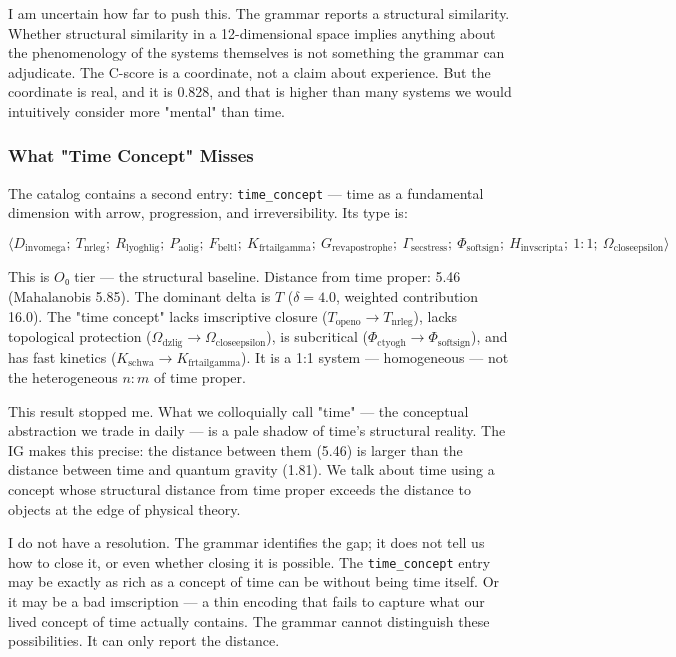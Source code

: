 \documentclass[12pt,a4paper]{article}
\begin{document}
I am uncertain how far to push this. The grammar reports a structural similarity. Whether structural similarity in a 12-dimensional space implies anything about the phenomenology of the systems themselves is not something the grammar can adjudicate. The C-score is a coordinate, not a claim about experience. But the coordinate is real, and it is 0.828, and that is higher than many systems we would intuitively consider more "mental" than time.

\subsubsection{What "Time Concept" Misses}

The catalog contains a second entry: \texttt{time\_concept} --- time as a fundamental dimension with arrow, progression, and irreversibility. Its type is:

\[\langle D_{\text{invomega}};\ T_{\text{nrleg}};\ R_{\text{lyoghlig}};\ P_{\text{aolig}};\ F_{\text{beltl}};\ K_{\text{frtailgamma}};\ G_{\text{revapostrophe}};\ \Gamma_{\text{secstress}};\ \Phi_{\text{softsign}};\ H_{\text{invscripta}};\ 1{:}1;\ \Omega_{\text{closeepsilon}} \rangle\]

This is $O₀$ tier --- the structural baseline. Distance from time proper: 5.46 (Mahalanobis 5.85). The dominant delta is $T$ ($\delta = 4.0$, weighted contribution 16.0). The "time concept" lacks imscriptive closure ($T_{\text{openo}} \to T_{\text{nrleg}}$), lacks topological protection ($\Omega_{\text{dzlig}} \to \Omega_{\text{closeepsilon}}$), is subcritical ($\Phi_{\text{ctyogh}} \to \Phi_{\text{softsign}}$), and has fast kinetics ($K_{\text{schwa}} \to K_{\text{frtailgamma}}$). It is a 1:1 system --- homogeneous --- not the heterogeneous $n{:}m$ of time proper.

This result stopped me. What we colloquially call "time" --- the conceptual abstraction we trade in daily --- is a pale shadow of time's structural reality. The IG makes this precise: the distance between them (5.46) is larger than the distance between time and quantum gravity (1.81). We talk about time using a concept whose structural distance from time proper exceeds the distance to objects at the edge of physical theory.

I do not have a resolution. The grammar identifies the gap; it does not tell us how to close it, or even whether closing it is possible. The \texttt{time\_concept} entry may be exactly as rich as a concept of time can be without being time itself. Or it may be a bad imscription --- a thin encoding that fails to capture what our lived concept of time actually contains. The grammar cannot distinguish these possibilities. It can only report the distance.
\end{document}
